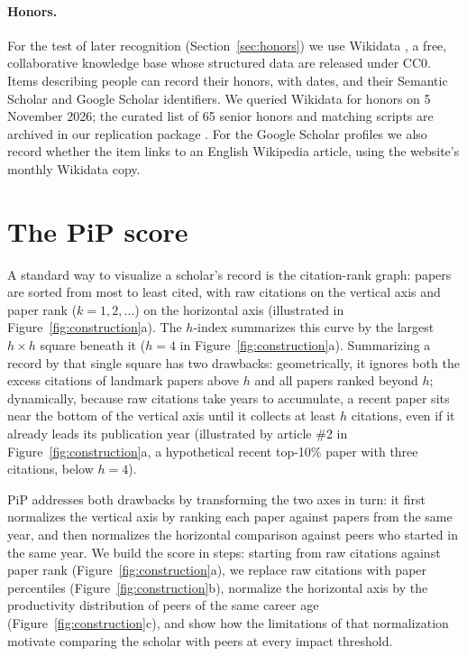 \documentclass[11pt]{article}
\begin{document}
\paragraph{Honors.} For the test of later recognition (Section~\ref{sec:honors}) we use Wikidata \citep{wikidata2026},
a free, collaborative knowledge base whose structured data are released under CC0. Items describing people can record
their honors, with dates, and their Semantic Scholar and Google Scholar identifiers. We queried Wikidata for honors on
5 November 2026; the curated list of 65 senior honors and matching scripts are archived in our replication package
\citep{ipeirotis2026replication}. For the Google Scholar profiles we also record whether the item links to an English
Wikipedia article, using the website's monthly Wikidata copy.

\section{The PiP score}
\label{sec:pip}

A standard way to visualize a scholar's record is the citation-rank graph: papers are sorted from most to least cited,
with raw citations on the vertical axis and paper rank ($k = 1, 2, \ldots$) on the horizontal axis
(illustrated in Figure~\ref{fig:construction}a). The $h$-index summarizes this curve by the largest $h \times h$ square
beneath it ($h = 4$ in Figure~\ref{fig:construction}a). Summarizing a record by that single square has two drawbacks:
geometrically, it ignores both the excess citations of landmark papers above $h$ and all papers ranked beyond $h$;
dynamically, because raw citations take years to accumulate, a recent paper sits near the bottom of the vertical axis
until it collects at least $h$ citations, even if it already leads its publication year (illustrated by article \#2 in
Figure~\ref{fig:construction}a, a hypothetical recent top-10\% paper with three citations, below $h = 4$).

PiP addresses both drawbacks by transforming the two axes in turn: it first normalizes the vertical axis by ranking each
paper against papers from the same year, and then normalizes the horizontal comparison against peers who started in the
same year. We build the score in steps: starting from raw citations against paper rank (Figure~\ref{fig:construction}a),
we replace raw citations with paper percentiles (Figure~\ref{fig:construction}b), normalize the horizontal axis by the
productivity distribution of peers of the same career age (Figure~\ref{fig:construction}c), and show how the limitations
of that normalization motivate comparing the scholar with peers at every impact threshold.
\end{document}
